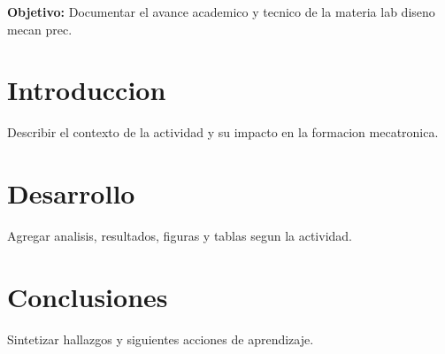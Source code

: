 \documentclass[spanish,letterpaper,oneside]{article}
\begin{document}
\templatePortrait
\templatePagecfg
\onehalfspacing

\begin{abstractd}
\textbf{Objetivo:} Documentar el avance academico y tecnico de la materia lab diseno mecan prec.
\end{abstractd}

\templateIndex
\templateFinalcfg

\section{Introduccion}
Describir el contexto de la actividad y su impacto en la formacion mecatronica.

\section{Desarrollo}
Agregar analisis, resultados, figuras y tablas segun la actividad.

\section{Conclusiones}
Sintetizar hallazgos y siguientes acciones de aprendizaje.



\end{document}

